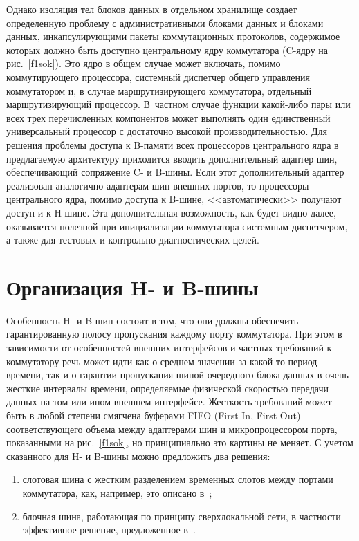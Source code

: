 \begin{multicols}{2}
    Однако изоляция тел блоков данных в отдельном хранилище создает определенную
проблему с административными блоками данных и блоками данных, инкапсулирующими пакеты
коммутационных протоколов, содержимое которых должно быть доступно центральному ядру
коммутатора (C-яд\-ру на рис.~\ref{f1sok}). Это ядро в общем случае может включать, помимо
коммутирующего процессора, системный диспетчер общего управления коммутатором и, в
случае маршрутизирующего коммутатора, отдельный маршрутизирующий процессор. 
В~частном случае функции ка\-кой-ли\-бо пары или всех трех перечисленных компонентов может
выполнять один единственный универсальный процессор с достаточно высокой
производительностью. Для решения проблемы доступа к B-па\-мя\-ти всех про\-цессо\-ров
центрального ядра в предлагаемую ар\-хи\-тектуру приходится вводить дополнительный адаптер
шин, обеспечивающий сопряжение C- и B-ши\-ны. Если этот дополнительный адаптер\linebreak
реализован анало\-гич\-но адаптерам шин внешних портов, то процессоры центрального ядра,
помимо доступа к %
\mbox{B-шине,} <<автоматически>> получают доступ и к H-ши\-не. Эта
дополнительная возможность, как будет видно далее, оказывается полезной при инициализации
коммутатора системным диспетчером, а также для тестовых и кон\-т\-роль\-но-диа\-гно\-сти\-че\-ских
\mbox{целей.}
{ %

}


\section{Организация H- и B-шины}

  Особенность H- и B-шин состоит в том, что они должны обеспечить гарантированную
полосу пропускания каждому порту коммутатора. При этом в зависимости от особенностей
внешних интерфейсов и частных требований к коммутатору речь может идти как о среднем
значении за какой-то период времени, так и о гарантии пропускания шиной очередного блока
данных в очень жесткие интервалы времени, определяемые физической скоростью передачи
данных на том или ином внешнем интерфейсе. Жесткость требований может быть в любой
степени смягчена буферами FIFO (First In, First Out)
соответствующего объема между адаптерами шин и
микропроцессором порта, показанными на рис.~\ref{f1sok}, но принципиально это картины не
меняет. С учетом сказанного для H- и B-шины можно предложить два решения:
    \begin{enumerate}[(1)]
\item слотовая шина с жестким разделением временных слотов между портами коммутатора,
как, например, это описано в~\cite{6sok};
\item блочная шина, работающая по принципу сверх\-ло\-каль\-ной сети, в частности
эффективное решение, предложенное в~\cite{7sok}.
\end{enumerate}


\end{multicols}
